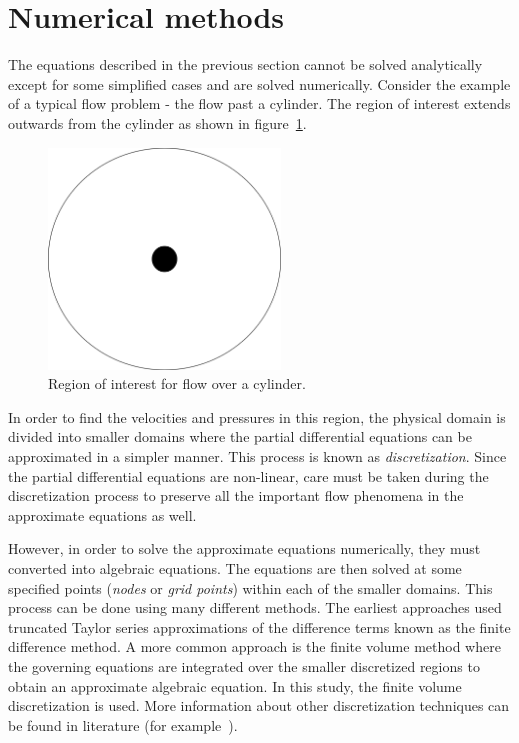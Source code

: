 \section{Numerical methods}
The equations described in the previous section cannot be solved analytically except for some simplified cases and are solved numerically. Consider the example of a typical flow problem - the flow past a cylinder. The region of interest extends outwards from the cylinder as shown in figure~\ref{fig:airfoildom}. 
\begin{figure}[h!]
\centering
\captionsetup{justification=centering}
 \includegraphics[width=0.55\textwidth]{ch2_litsurvey/Figures/airfoil_domain.png}
\caption{Region of interest for flow over a cylinder.}
 \label{fig:airfoildom}
\end{figure} 
In order to find the velocities and pressures in this region, the physical domain is divided into smaller domains where the partial differential equations can be approximated in a simpler manner. This process is known as \textit{discretization}. Since the partial differential equations are non-linear, care must be taken during the discretization process to preserve all the important flow phenomena in the approximate equations as well. 

However, in order to solve the approximate equations numerically, they must converted into algebraic equations. The equations are then solved at some specified points (\textit{nodes} or \textit{grid points}) within each of the smaller domains. This process can be done using many different methods. The earliest approaches used truncated Taylor series approximations of the difference terms known as the finite difference method. A more common approach is the finite volume method where the governing equations are integrated over the smaller discretized regions to obtain an approximate algebraic equation. In this study, the finite volume discretization is used. More information about other discretization techniques can be found in literature (for example~\cite{Moukalled,hirsch1997numerical,Ferziger2002}).
